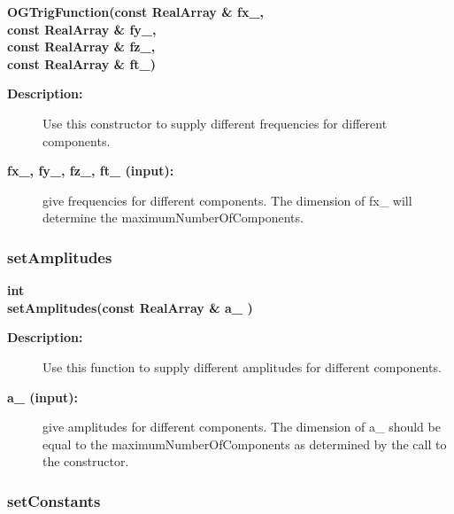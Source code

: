  
\begin{flushleft} \textbf{%
\settowidth{\OGTrigFunctionIncludeArgIndent}{OGTrigFunction(}%
OGTrigFunction(const RealArray \& fx\_, \\ 
\hspace{\OGTrigFunctionIncludeArgIndent}const RealArray \& fy\_, \\ 
\hspace{\OGTrigFunctionIncludeArgIndent}const RealArray \& fz\_, \\ 
\hspace{\OGTrigFunctionIncludeArgIndent}const RealArray \& ft\_)
}\end{flushleft}
\begin{description}
\item[{\bf Description:}]  
 
 Use this constructor to supply different frequencies for different components.

\item[{\bf fx\_, fy\_, fz\_, ft\_ (input):}]  give frequencies for different components. The dimension of fx\_
        will determine the maximumNumberOfComponents.

\end{description}
\subsubsection{setAmplitudes}
 
\begin{flushleft} \textbf{%
int  \\ 
\settowidth{\OGTrigFunctionIncludeArgIndent}{setAmplitudes(}%
setAmplitudes(const RealArray \& a\_ )
}\end{flushleft}
\begin{description}
\item[{\bf Description:}]  
 
 Use this function to supply different amplitudes for different components.

\item[{\bf a\_ (input):}]  give amplitudes for different components. The dimension of a\_
   should be equal to the maximumNumberOfComponents as determined by the call to the constructor.

\end{description}
\subsubsection{setConstants}
 
